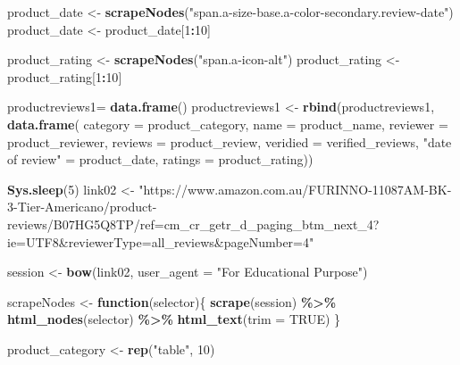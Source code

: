 \documentclass[
]{article}
\newenvironment{Shaded}{\begin{snugshade}}{\end{snugshade}}
\newcommand{\AttributeTok}[1]{\textcolor[rgb]{0.13,0.29,0.53}{#1}}
\newcommand{\ConstantTok}[1]{\textcolor[rgb]{0.56,0.35,0.01}{#1}}
\newcommand{\ControlFlowTok}[1]{\textcolor[rgb]{0.13,0.29,0.53}{\textbf{#1}}}
\newcommand{\DecValTok}[1]{\textcolor[rgb]{0.00,0.00,0.81}{#1}}
\newcommand{\FunctionTok}[1]{\textcolor[rgb]{0.13,0.29,0.53}{\textbf{#1}}}
\newcommand{\NormalTok}[1]{#1}
\newcommand{\OtherTok}[1]{\textcolor[rgb]{0.56,0.35,0.01}{#1}}
\newcommand{\SpecialCharTok}[1]{\textcolor[rgb]{0.81,0.36,0.00}{\textbf{#1}}}
\newcommand{\StringTok}[1]{\textcolor[rgb]{0.31,0.60,0.02}{#1}}
\begin{document}
\begin{Shaded}
\begin{Highlighting}[]
\NormalTok{  product\_date }\OtherTok{\textless{}{-}} \FunctionTok{scrapeNodes}\NormalTok{(}\StringTok{"span.a{-}size{-}base.a{-}color{-}secondary.review{-}date"}\NormalTok{)}
\NormalTok{  product\_date }\OtherTok{\textless{}{-}}\NormalTok{ product\_date[}\DecValTok{1}\SpecialCharTok{:}\DecValTok{10}\NormalTok{]}
  
\NormalTok{  product\_rating }\OtherTok{\textless{}{-}} \FunctionTok{scrapeNodes}\NormalTok{(}\StringTok{"span.a{-}icon{-}alt"}\NormalTok{)}
\NormalTok{  product\_rating }\OtherTok{\textless{}{-}}\NormalTok{ product\_rating[}\DecValTok{1}\SpecialCharTok{:}\DecValTok{10}\NormalTok{]}
  
\NormalTok{  productreviews1}\OtherTok{=} \FunctionTok{data.frame}\NormalTok{()}
\NormalTok{  productreviews1 }\OtherTok{\textless{}{-}} \FunctionTok{rbind}\NormalTok{(productreviews1, }\FunctionTok{data.frame}\NormalTok{(}
                      \AttributeTok{category =}\NormalTok{ product\_category,}
                      \AttributeTok{name =}\NormalTok{ product\_name,}
                      \AttributeTok{reviewer =}\NormalTok{ product\_reviewer,}
                      \AttributeTok{reviews =}\NormalTok{ product\_review,}
                      \AttributeTok{veridied =}\NormalTok{ verified\_reviews,}
                      \StringTok{"date of review"} \OtherTok{=}\NormalTok{ product\_date,}
                      \AttributeTok{ratings =}\NormalTok{ product\_rating))}

  
 \FunctionTok{Sys.sleep}\NormalTok{(}\DecValTok{5}\NormalTok{)}
\NormalTok{link02 }\OtherTok{\textless{}{-}} \StringTok{"https://www.amazon.com.au/FURINNO{-}11087AM{-}BK{-}3{-}Tier{-}Americano/product{-}reviews/B07HG5Q8TP/ref=cm\_cr\_getr\_d\_paging\_btm\_next\_4?ie=UTF8\&reviewerType=all\_reviews\&pageNumber=4"}


\NormalTok{  session }\OtherTok{\textless{}{-}} \FunctionTok{bow}\NormalTok{(link02,}
               \AttributeTok{user\_agent =} \StringTok{"For Educational Purpose"}\NormalTok{)}

\NormalTok{  scrapeNodes }\OtherTok{\textless{}{-}} \ControlFlowTok{function}\NormalTok{(selector)\{}
    \FunctionTok{scrape}\NormalTok{(session) }\SpecialCharTok{\%\textgreater{}\%}
      \FunctionTok{html\_nodes}\NormalTok{(selector) }\SpecialCharTok{\%\textgreater{}\%}
      \FunctionTok{html\_text}\NormalTok{(}\AttributeTok{trim =} \ConstantTok{TRUE}\NormalTok{)}
\NormalTok{  \}}

\NormalTok{  product\_category }\OtherTok{\textless{}{-}} \FunctionTok{rep}\NormalTok{(}\StringTok{"table"}\NormalTok{, }\DecValTok{10}\NormalTok{)}


\end{Highlighting}
\end{Shaded}
\end{document}
